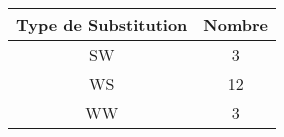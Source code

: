 \begin{table}[ht]
\centering
\begin{tabular}{cc}
  \hline
Type de Substitution & Nombre \\ 
  \hline
SW &   3 \\ 
  WS &  12 \\ 
  WW &   3 \\ 
   \hline
\end{tabular}
\end{table}

